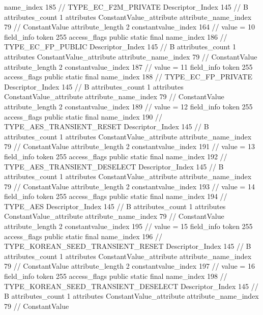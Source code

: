 {{{{{				name_index	185		// TYPE_EC_F2M_PRIVATE
				Descriptor_Index	145		// B
				attributes_count	1
				attributes {
				ConstantValue_attribute {
					attribute_name_index	79		// ConstantValue
					attribute_length	2
					constantvalue_index	164		// value = 10
				}
				}
			}
			field_info {
				token	255
				access_flags	public static final
				name_index	186		// TYPE_EC_FP_PUBLIC
				Descriptor_Index	145		// B
				attributes_count	1
				attributes {
				ConstantValue_attribute {
					attribute_name_index	79		// ConstantValue
					attribute_length	2
					constantvalue_index	187		// value = 11
				}
				}
			}
			field_info {
				token	255
				access_flags	public static final
				name_index	188		// TYPE_EC_FP_PRIVATE
				Descriptor_Index	145		// B
				attributes_count	1
				attributes {
				ConstantValue_attribute {
					attribute_name_index	79		// ConstantValue
					attribute_length	2
					constantvalue_index	189		// value = 12
				}
				}
			}
			field_info {
				token	255
				access_flags	public static final
				name_index	190		// TYPE_AES_TRANSIENT_RESET
				Descriptor_Index	145		// B
				attributes_count	1
				attributes {
				ConstantValue_attribute {
					attribute_name_index	79		// ConstantValue
					attribute_length	2
					constantvalue_index	191		// value = 13
				}
				}
			}
			field_info {
				token	255
				access_flags	public static final
				name_index	192		// TYPE_AES_TRANSIENT_DESELECT
				Descriptor_Index	145		// B
				attributes_count	1
				attributes {
				ConstantValue_attribute {
					attribute_name_index	79		// ConstantValue
					attribute_length	2
					constantvalue_index	193		// value = 14
				}
				}
			}
			field_info {
				token	255
				access_flags	public static final
				name_index	194		// TYPE_AES
				Descriptor_Index	145		// B
				attributes_count	1
				attributes {
				ConstantValue_attribute {
					attribute_name_index	79		// ConstantValue
					attribute_length	2
					constantvalue_index	195		// value = 15
				}
				}
			}
			field_info {
				token	255
				access_flags	public static final
				name_index	196		// TYPE_KOREAN_SEED_TRANSIENT_RESET
				Descriptor_Index	145		// B
				attributes_count	1
				attributes {
				ConstantValue_attribute {
					attribute_name_index	79		// ConstantValue
					attribute_length	2
					constantvalue_index	197		// value = 16
				}
				}
			}
			field_info {
				token	255
				access_flags	public static final
				name_index	198		// TYPE_KOREAN_SEED_TRANSIENT_DESELECT
				Descriptor_Index	145		// B
				attributes_count	1
				attributes {
				ConstantValue_attribute {
					attribute_name_index	79		// ConstantValue
}}}}}}}
